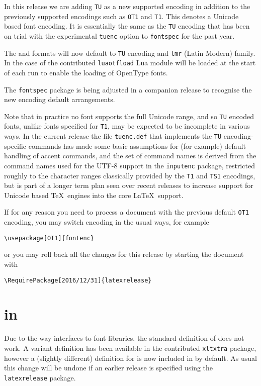 \documentclass{ltnews}
\providecommand\pkg[1]{\texttt{#1}}
\providecommand\option[1]{\texttt{#1}}
\providecommand\file[1]{\texttt{#1}}
\begin{document}
In this release we are adding \texttt{TU} as a new supported
encoding in addition to the previously supported encodings such as \texttt{OT1}
and \texttt{T1}. This denotes a Unicode based font encoding. It is essentially
the same as the \texttt{TU} encoding that has been on trial with the
experimental \option{tuenc} option to \pkg{fontspec} for the past
year.

The  and  formats will now default
to \texttt{TU} encoding and \texttt{lmr} (Latin Modern) family. In the
case of  the contributed \texttt{luaotfload} Lua
module will be loaded at the start of each run to enable the loading
of OpenType fonts.

The \pkg{fontspec} package is being adjusted in a companion release
to recognise the new encoding default arrangements.

Note that in practice no font supports the full Unicode range, and so
\texttt{TU} encoded fonts, unlike fonts specified for \texttt{T1}, may be
expected to be incomplete in various ways. In the current release the file
\file{tuenc.def} that implements the \texttt{TU} encoding-specific commands
has made some basic assumptions for (for example) default handling of
accent commands, and the set of command names is derived from the
command names used for the UTF-8 support in the \pkg{inputenc} package,
restricted roughly to the character ranges classically provided by
the \texttt{T1} and \texttt{TS1} encodings, but is part of a longer term plan
seen over recent releases to increase support for Unicode based \TeX\ engines
into the core \LaTeX\ support.



If for any reason you need to process a document with the previous
default \texttt{OT1} encoding, you may switch encoding in the usual ways, for
example
\begin{verbatim}
\usepackage[OT1]{fontenc}
\end{verbatim}
or you may roll back all the changes for this release by starting the
document with
\begin{verbatim}
\RequirePackage[2016/12/31]{latexrelease}
\end{verbatim}

\section{ in }
Due to the way  interfaces to font libraries, the
standard definition of  does not work.  A variant
definition has been available in the contributed \pkg{xltxtra}
package, however a (slightly different) definition for 
is now included in  by default. As usual
this change will be undone if an earlier
release is specified using the \pkg{latexrelease} package.
\end{document}
